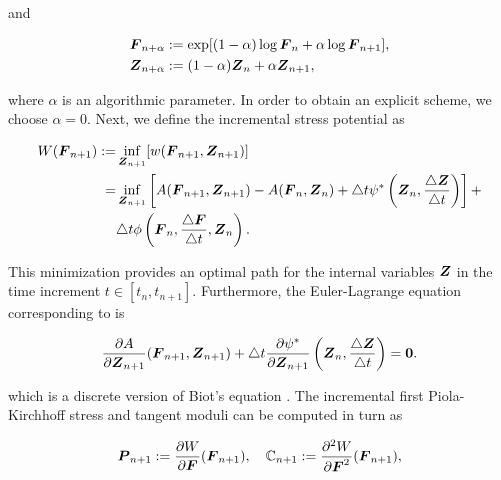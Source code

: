 \documentclass[12pt]{article}
\numberwithin{equation}{section}
\begin{document}
and

\begin{equation} \label{eq:mid-values}
  \begin{split}
    {\boldsymbol{F}}_{n+\alpha} & := \exp[(1 - \alpha) \log {\boldsymbol{F}}_n + \alpha \log {\boldsymbol{F}}_{n+1}],
    \\
    {\boldsymbol{Z}}_{n+\alpha} & := (1 - \alpha) {\boldsymbol{Z}}_n + \alpha {\boldsymbol{Z}}_{n+1},
  \end{split}
\end{equation}

where $\alpha$ is an algorithmic parameter. In order to obtain an
explicit scheme, we choose $\alpha = 0$. Next, we define the
incremental stress potential as

\begin{equation} \label{eq:incremental-stress-potential}
  \begin{split}
    W({\boldsymbol{F}}_{n+1})
    :=
    &
    \inf_{{\boldsymbol{Z}}_{n+1}}[w({\boldsymbol{F}}_{n+1}, {\boldsymbol{Z}}_{n+1})]
    \\
    =
    &
    \inf_{{\boldsymbol{Z}}_{n+1}}
    \left[
      A({\boldsymbol{F}}_{n+1}, {\boldsymbol{Z}}_{n+1}) - A({\boldsymbol{F}}_n, {\boldsymbol{Z}}_n)
      +
      \triangle t
      \psi^*\left({\boldsymbol{Z}}_n, \frac{\triangle {\boldsymbol{Z}}}{\triangle t}\right)
    \right]
    +
    \\
    &
    \triangle t
    \phi\left({\boldsymbol{F}}_n, \frac{\triangle {\boldsymbol{F}}}{\triangle t}, {\boldsymbol{Z}}_n\right).
  \end{split}
\end{equation}

This minimization provides an optimal path for the internal variables
${\boldsymbol{Z}}$ in the time increment $t \in [t_n, t_{n+1}]$. Furthermore, the
Euler-Lagrange equation corresponding to
 is

\begin{equation} \label{eq:Biots-equation-discrete}
  \frac{\partial A}{\partial {\boldsymbol{Z}}_{n+1}}({\boldsymbol{F}}_{n+1}, {\boldsymbol{Z}}_{n+1})
  +
  \triangle t
  \frac{\partial \psi^*}{\partial {\boldsymbol{Z}}_{n+1}}
  \left({\boldsymbol{Z}}_n, \frac{\triangle {\boldsymbol{Z}}}{\triangle t}\right)
  =
  \mathbf{0}.
\end{equation}

which is a discrete version of Biot's equation
 \citep{Miehe.etal:2002}. The
incremental first Piola-Kirchhoff stress and tangent moduli can be
computed in turn as

\begin{equation} \label{eq:incremental-stress-moduli}
  {\boldsymbol{P}}_{n+1} := \frac{\partial W}{\partial {\boldsymbol{F}}} ({\boldsymbol{F}}_{n+1}),
  \quad
  \mathbb{C}_{n+1} := \frac{\partial^2 W}{\partial {\boldsymbol{F}}^2} ({\boldsymbol{F}}_{n+1}),
\end{equation}
\end{document}

